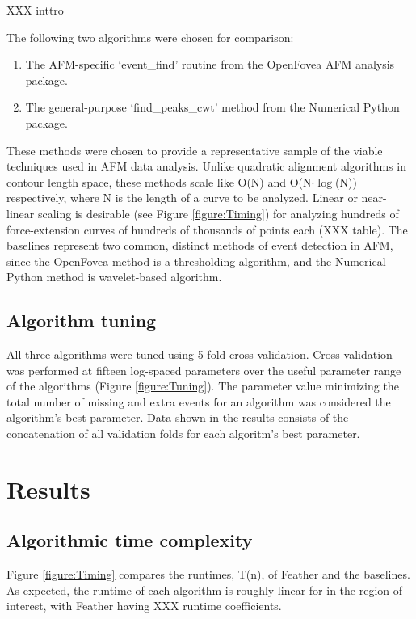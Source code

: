 \documentclass[%
  aip,12pt,tightenlines,
  amsthm,
 amsmath,amssymb
]{article}
\newcommand{\fRef}[1]{Figure \ref{figure:#1}}
\newcommand{\sLabel}[1]{\label{section:#1}}
\newcommand{\firstp}[0]{}
\newcommand{\pl}[0]{\vspace{6pt}}
\newcommand{\name}[0]{Feather}
\begin{document}
XXX inttro

\firstp The following two algorithms were chosen for comparison: \pl

\begin{enumerate}
\item The AFM-specific `event\_find' routine from the OpenFovea AFM analysis package.\cite{roduit_openfovea:_2012}
\item The general-purpose `find\_peaks\_cwt' method from the Numerical Python package.
\end{enumerate}

 These methods were chosen to provide a representative sample of the viable techniques used in AFM data analysis. Unlike quadratic alignment algorithms in contour length space, these methods scale like O(N) and O(N$\cdot\log$(N)) respectively, where N is the length of a curve to be analyzed. Linear or near-linear scaling is desirable (see \fRef{Timing}) for analyzing hundreds of force-extension curves of hundreds of thousands of points each (XXX table). The baselines represent two common, distinct methods of event detection in AFM, since the OpenFovea method is a thresholding algorithm, and the Numerical Python method is wavelet-based algorithm. \pl

\subsection{\sLabel{Tuning}Algorithm tuning }

\firstp All three algorithms were tuned using 5-fold cross validation. Cross validation was performed at fifteen log-spaced parameters over the useful parameter range of the algorithms (\fRef{Tuning}). The parameter value minimizing the total number of missing and extra events for an algorithm was considered the algorithm's best parameter. Data shown in the results consists of the concatenation of all validation folds for each algoritm's best parameter.


\section{\sLabel{Results}Results}

\subsection{\sLabel{Timing}Algorithmic time complexity}

\firstp \fRef{Timing} compares the runtimes, T(n), of \name{} and the baselines. As expected, the runtime of each algorithm is roughly linear for in the region of interest, with \name{} having XXX  runtime coefficients.  \pl
\end{document}
